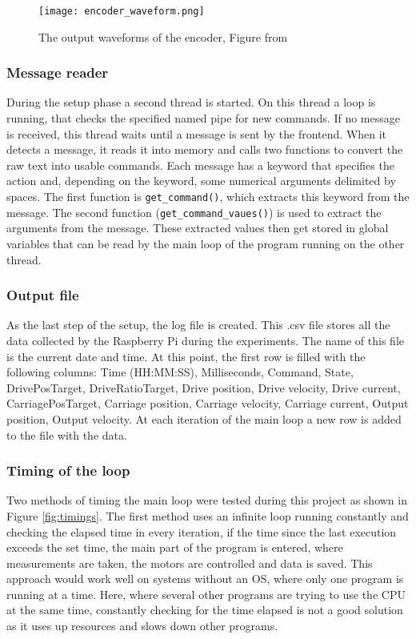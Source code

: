 \documentclass[12pt]{article}
\begin{document}
\begin{figure}[!h]
    \centering
    \texttt{[image: encoder\_waveform.png]}
    \caption{The output waveforms of the encoder, Figure from \cite{encoder}}
    \label{fig:encoder}
\end{figure}



\subsubsection{Message reader}
During the setup phase a second thread is started. On this thread a loop is running, that checks the specified named pipe for new commands. If no message is received, this thread waits until a message is sent by the frontend. When it detects a message, it reads it into memory and calls two functions to convert the raw text into usable commands. Each message has a keyword that specifies the action and, depending on the keyword, some numerical arguments delimited by spaces. The first function is \verb|get_command()|, which extracts this keyword from the message. The second function (\verb|get_command_vaues()|) is used to extract the arguments from the message. These extracted values then get stored in global variables that can be read by the main loop of the program running on the other thread. 


\subsubsection{Output file}
\label{sec:outputFile}
As the last step of the setup, the log file is created. This .csv file stores all the data collected by the Raspberry Pi during the experiments. The name of this file is the current date and time. At this point, the first row is filled with the following columns: Time (HH:MM:SS), Milliseconds, Command, State, DrivePosTarget, DriveRatioTarget, Drive position, Drive velocity, Drive current, CarriagePosTarget, Carriage position, Carriage velocity, Carriage current, Output position, Output velocity. At each iteration of the main loop a new row is added to the file with the data.



\subsubsection{Timing of the loop}

Two methods of timing the main loop were tested during this project as shown in Figure \ref{fig:timings}. The first method uses an infinite loop running constantly and checking the elapsed time in every iteration, if the time since the last execution exceeds the set time, the main part of the program is entered, where measurements are taken, the motors are controlled and data is saved. This approach would work well on systems without an OS, where only one program is running at a time. Here, where several other programs are trying to use the CPU at the same time, constantly checking for the time elapsed is not a good solution as it uses up resources and slows down other programs.\\
\end{document}
